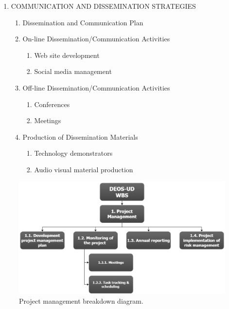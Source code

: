 \begin{enumerate}[label*=\arabic*.]
	\item COMMUNICATION AND DISSEMINATION STRATEGIES
	
	\begin{enumerate}[label*=\arabic*.]
		\item Dissemination and Communication Plan
		\item On-line Dissemination/Communication Activities
		\begin{enumerate}[label*=\arabic*.]
			\item Web site development
			\item Social media management
		\end{enumerate}
		\item Off-line Dissemination/Communication Activities
		\begin{enumerate}[label*=\arabic*.]
			\item Conferences
			\item Meetings
		\end{enumerate}
		\item Production of Dissemination Materials
		\begin{enumerate}[label*=\arabic*.]
			\item Technology demonstrators
			\item Audio visual material production
		\end{enumerate}
	\end{enumerate}
	
\end{enumerate}


\begin{figure}[H]
	\centering
	\includegraphics[width=\textwidth]{./sections/2.WBS/WBS_Section1}
	\caption[Project management breakdown diagram]{Project management breakdown diagram.}
	\label{fig:WBS_Section1}
\end{figure}

